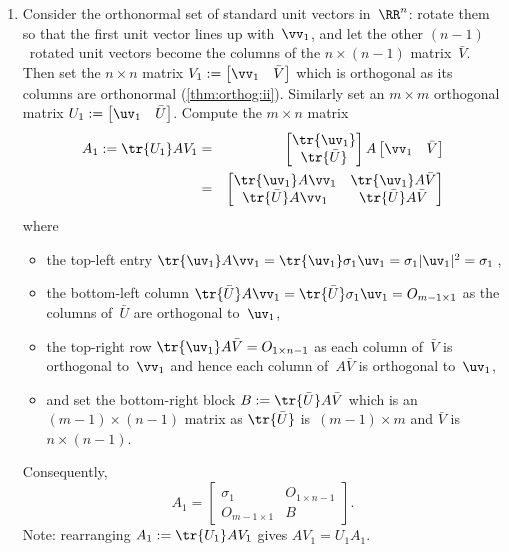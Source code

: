 \begin{enumerate}
\item Consider the orthonormal set of standard unit vectors in~\(\RR^n\): rotate them so that the first unit vector lines up with~\(\vv_1\), and let the other \((n-1)\)~rotated unit vectors become the columns of the \(n\times(n-1)\) matrix~\(\bar V\).
Then set the \(n\times n\) matrix
\(V_1:=\begin{bmatrix}\vv_1&\bar V\end{bmatrix}\) which is orthogonal as its columns are orthonormal (\autoref{thm:orthog:ii}).
Similarly set an \(m\times m\) orthogonal matrix
\(U_1:=\begin{bmatrix}\uv_1&\bar U\end{bmatrix}\).
Compute the \(m\times n\) matrix
\begin{eqnarray*}
A_1:=\tr{U_1}AV_1
&=&\begin{bmatrix} \tr{\uv_1}\\\tr{\bar U} \end{bmatrix}A
\begin{bmatrix} \vv_1 &\bar V \end{bmatrix}
\\&=&\begin{bmatrix} \tr{\uv_1}A\vv_1 & \tr{\uv_1}A\bar V
\\\tr{\bar U}A\vv_1&\tr{\bar U}A\bar V \end{bmatrix}
\end{eqnarray*}
where
\begin{itemize}
\item the top-left entry \(\tr{\uv_1}A\vv_1=\tr{\uv_1}\sigma_1\uv_1=\sigma_1|\uv_1|^2=\sigma_1\)\,,
\item the bottom-left column \(\tr{\bar U}A\vv_1=\tr{\bar U}\sigma_1\uv_1=O_{m-1\times 1}\) as the columns of~\(\bar U\) are orthogonal to~\(\uv_1\),
\item the top-right row \(\tr{\uv_1}A\bar V=O_{1\times n-1}\) as each column of~\(\bar V\) is orthogonal to~\(\vv_1\) and hence each column of~\(A\bar V\) is orthogonal to~\(\uv_1\),
\item and set the bottom-right block \(B:=\tr{\bar U}A\bar V\) which is an \((m-1)\times(n-1)\) matrix as \(\tr{\bar U}\) is~\((m-1)\times m\) and \(\bar V\) is \(n\times(n-1)\).
\end{itemize}
Consequently, 
\begin{equation*}
A_1=\begin{bmatrix} \sigma_1&O_{1\times n-1}
\\O_{m-1\times 1}&B \end{bmatrix}.
\end{equation*}%
Note: rearranging \(A_1:=\tr{U_1}AV_1\) gives \(AV_1=U_1A_1\).


\end{enumerate}
